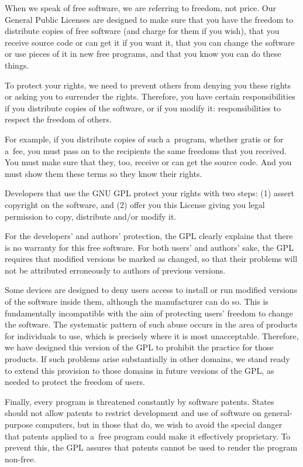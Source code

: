 \documentclass[a4paper, 11pt, twoside]{article}
\begin{document}
When we speak of free software, we are referring to freedom, not price. Our General Public Licenses are designed to make sure that you have the freedom to distribute copies of free software (and charge for them if you wish), that you receive source code or can get it if you want it, that you can change the software or use pieces of it in new free programs, and that you know you can do these things.

To protect your rights, we need to prevent others from denying you these rights or asking you to surrender the rights. Therefore, you have certain responsibilities if you distribute copies of the software, or if you modify it: responsibilities to respect the freedom of others.

For example, if you distribute copies of such a~program, whether gratis or for a~fee, you must pass on to the recipients the same freedoms that you received. You must make sure that they, too, receive or can get the source code. And you must show them these terms so they know their rights.

Developers that use the GNU GPL protect your rights with two steps: (1) assert copyright on the software, and (2) offer you this License giving you legal permission to copy, distribute and/or modify it.

For the developers' and authors' protection, the GPL clearly explains that there is no warranty for this free software. For both users' and authors' sake, the GPL requires that modified versions be marked as changed, so that their problems will not be attributed erroneously to authors of previous versions.

Some devices are designed to deny users access to install or run modified versions of the software inside them, although the manufacturer can do so. This is fundamentally incompatible with the aim of protecting users' freedom to change the software. The systematic pattern of such abuse occurs in the area of products for individuals to use, which is precisely where it is most unacceptable. Therefore, we have designed this version of the GPL to prohibit the practice for those products. If such problems arise substantially in other domains, we stand ready to extend this provision to those domains in future versions of the GPL, as needed to protect the freedom of users.

Finally, every program is threatened constantly by software patents. States should not allow patents to restrict development and use of software on general-purpose computers, but in those that do, we wish to avoid the special danger that patents applied to a~free program could make it effectively proprietary. To prevent this, the GPL assures that patents cannot be used to render the program non-free.
\end{document}

